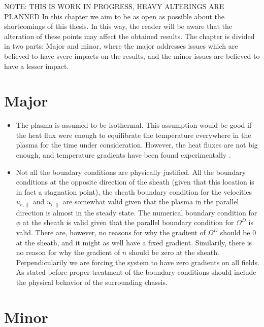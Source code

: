 NOTE: THIS IS WORK IN PROGRESS, HEAVY ALTERINGS ARE PLANNED
In this chapter we aim to be as open as possible about the shortcomings of this thesis.
In this way, the reader will be aware that the alteration of these points may affect the obtained results.
The chapter is divided in two parts: Major and minor, where the major addresses issues which are believed to have svere impacts on the results, and the minor issues are believed to have a lesser impact.

\section{Major}
\begin{itemize}[noitemsep,nolistsep]
    \item The plasma is assumed to be isothermal.
        This assumption would be good if the heat flux were enough to equilibrate the temperature everywhere in the plasma for the time under consideration.
        However, the heat fluxes are not big enough, and temperature gradients have been found experimentally \cite{Schroder2003Phd}.
    \item Not all the boundary conditions are  physically justified.
        All the boundary conditions at the opposite direction of the sheath (given that this location is in fact a stagnation point), the sheath boundary condition for the velocities $u_{e,\|}$ and $u_{i,\|}$ are somewhat valid given that the plasma in the parallel direction is almost in the steady state.
        The numerical boundary condition for $\phi$ at the sheath is valid given that the parallel boundary condition for $\Omega^D$ is valid.
        There are, however, no reasons for why the gradient of $\Omega^D$ should be $0$ at the sheath, and it might as well have a fixed gradient.
        Similarily, there is no reason for why the gradient of $n$ should be zero at the sheath.
        Perpendicularily we are forcing the system to have zero gradients on all fields.
        As stated before proper treatment of the boundary conditions should include the physical behavior of the surrounding chassis.
\end{itemize}

\section{Minor}

